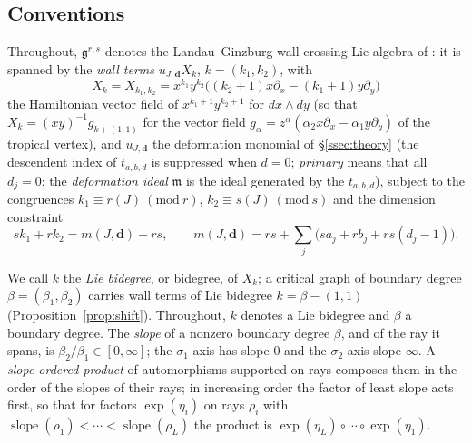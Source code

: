\documentclass[11pt]{amsart}
\theoremstyle{definition}
\theoremstyle{remark}
\newcommand{\gfrak}{\mathfrak{g}}
\begin{document}
\subsection*{Conventions}
Throughout, $\gfrak^{r,s}$ denotes the Landau--Ginzburg wall-crossing Lie algebra
of \cite[Def.~4.23]{GKT}: it is spanned by the \emph{wall terms}
$u_{J,\mathbf d}X_{k}$, $k=(k_1,k_2)$, with
\[
X_{k}=X_{k_{1},k_{2}}=x^{k_{1}}y^{k_{2}}\bigl((k_{2}{+}1)x\partial_{x}-(k_{1}{+}1)
y\partial_{y}\bigr)
\]
the Hamiltonian vector field of $x^{k_{1}+1}y^{k_{2}+1}$ for $dx\wedge dy$ (so
that $X_{k}=(xy)^{-1}g_{k+(1,1)}$ for the vector field
$g_\alpha=z^\alpha(\alpha_2x\partial_x-\alpha_1y\partial_y)$ of the tropical
vertex), and
$u_{J,\mathbf d}$ the deformation monomial of \S\ref{ssec:theory} (the
descendent index of $t_{a,b,d}$ is suppressed when $d=0$; \emph{primary} means
that all $d_j=0$; the \emph{deformation ideal} $\mathfrak m$ is the ideal
generated by the $t_{a,b,d}$), subject to the
congruences $k_{1}\equiv r(J)\ (\mathrm{mod}\ r)$, $k_{2}\equiv s(J)\
(\mathrm{mod}\ s)$ and the dimension constraint
\begin{equation}
\label{eq:dimconstraint}
sk_{1}+rk_{2}=m(J,\mathbf d)-rs,
\qquad
m(J,\mathbf d)=rs+\sum_{j}\bigl(sa_{j}+rb_{j}+rs(d_{j}-1)\bigr).
\end{equation}

We call $k$ the \emph{Lie bidegree}, or bidegree, of $X_k$; a critical graph
of boundary degree $\beta=(\beta_1,\beta_2)$ carries wall terms of Lie bidegree
$k=\beta-(1,1)$ (Proposition~\ref{prop:shift}).  Throughout, $k$ denotes a Lie
bidegree and $\beta$ a boundary degree.  The \emph{slope} of a nonzero
boundary degree $\beta$, and of the ray it spans, is
$\beta_2/\beta_1\in[0,\infty]$; the $\sigma_1$-axis has slope $0$ and the
$\sigma_2$-axis slope $\infty$.  A \emph{slope-ordered product} of
automorphisms supported on rays composes them in the order of the slopes of
their rays; in increasing order the factor of least slope acts first, so that
for factors $\exp(\eta_i)$ on rays $\rho_i$ with
$\operatorname{slope}(\rho_1)<\cdots<\operatorname{slope}(\rho_L)$ the product
is $\exp(\eta_L)\circ\cdots\circ\exp(\eta_1)$.
\end{document}
